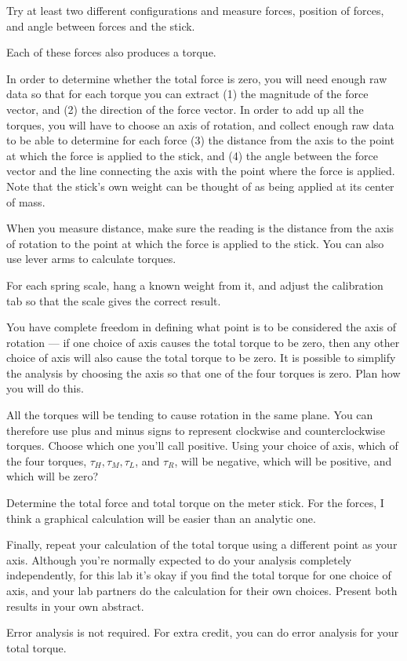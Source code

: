 Try at least two different configurations and measure forces, position of forces, and angle between forces and the stick. 

Each of these forces also produces a torque.

In order to determine whether the total force is zero, you
will need enough raw data so that for each torque you can
extract (1) the magnitude of the force vector, and (2) the
direction of the force vector.  In order to add up all the
torques, you will have to choose an axis of rotation, and
collect enough raw data to be able to determine for each
force (3) the distance from the axis to the point at which
the force is applied to the stick, and (4) the angle between
the force vector and the line connecting the axis with the
point where the force is applied.  Note that the stick's own weight can be thought of as being applied
at its center of mass.

When you measure distance, make sure the reading is the distance from the axis of rotation to the point at which the force is applied to the stick. 
You can also use lever arms to calculate torques. 


For each spring scale, hang a known weight from it, and adjust the
calibration tab so that the scale gives the correct result.


\prelab

\prelabquestion  You have complete freedom in defining what point is to be considered the axis of
rotation ---  if one choice of axis causes the total torque
to be zero, then any other choice of axis will also cause
the total torque to be zero.  It is possible to simplify the
analysis by choosing the axis so that one of the four
torques is zero.  Plan how you will do this.

\prelabquestion  All the torques will be tending to cause rotation in the
same plane.  You can therefore use plus and minus signs to
represent clockwise and counterclockwise torques.  Choose
which one you'll call positive.  Using your choice of axis,
which of the four torques, $\tau_H,\tau_M,\tau_L$, and
$\tau_R$, will be negative, which will be positive,
and which will be zero?

\analysis

Determine the total force and total torque on the meter
stick.  For the forces, I think a graphical calculation will
be easier than an analytic one.

Finally, repeat your calculation of the total torque using a
different point as your axis. Although you're normally expected to
do your analysis completely independently, for this lab it's okay
if you find the total torque for one choice of axis, and your lab
partners do the calculation for their own choices. Present both
results in your own abstract.

Error analysis is not required. For extra credit, you can do
error analysis for your total torque.
